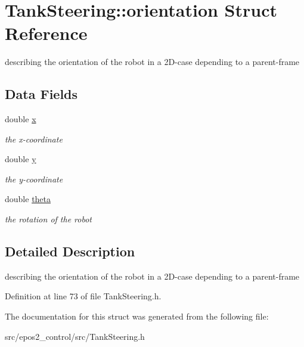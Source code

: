\hypertarget{structTankSteering_1_1orientation}{\section{Tank\-Steering\-:\-:orientation Struct Reference}
\label{structTankSteering_1_1orientation}
}


describing the orientation of the robot in a 2\-D-\/case depending to a parent-\/frame  


\subsection*{Data Fields}
\begin{DoxyCompactItemize}
\item 
\hypertarget{structTankSteering_1_1orientation_af121cb548f0f9fcfc8a294654b1ceb85}{double \hyperlink{structTankSteering_1_1orientation_af121cb548f0f9fcfc8a294654b1ceb85}{x}}\label{structTankSteering_1_1orientation_af121cb548f0f9fcfc8a294654b1ceb85}

\begin{DoxyCompactList}\small\item\em the x-\/coordinate \end{DoxyCompactList}\item 
\hypertarget{structTankSteering_1_1orientation_a6fa34c399e16ffa4c8b8145126c6c9bf}{double \hyperlink{structTankSteering_1_1orientation_a6fa34c399e16ffa4c8b8145126c6c9bf}{y}}\label{structTankSteering_1_1orientation_a6fa34c399e16ffa4c8b8145126c6c9bf}

\begin{DoxyCompactList}\small\item\em the y-\/coordinate \end{DoxyCompactList}\item 
\hypertarget{structTankSteering_1_1orientation_a9e0356a869ea75261e37e089262cc5e8}{double \hyperlink{structTankSteering_1_1orientation_a9e0356a869ea75261e37e089262cc5e8}{theta}}\label{structTankSteering_1_1orientation_a9e0356a869ea75261e37e089262cc5e8}

\begin{DoxyCompactList}\small\item\em the rotation of the robot \end{DoxyCompactList}\end{DoxyCompactItemize}


\subsection{Detailed Description}
describing the orientation of the robot in a 2\-D-\/case depending to a parent-\/frame 

Definition at line 73 of file Tank\-Steering.\-h.



The documentation for this struct was generated from the following file\-:\begin{DoxyCompactItemize}
\item 
src/epos2\-\_\-control/src/Tank\-Steering.\-h\end{DoxyCompactItemize}
